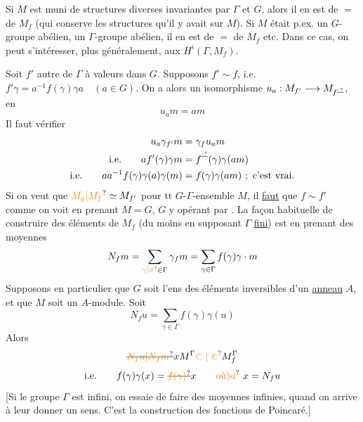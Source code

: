 Si $M$ est muni  de structures diverses invariantes par $\Gamma$ et $G$, alors il en est de $=$ de $M_f$ (qui conserve les structures qu'il y avait sur $M$). Si $M$ était p.ex. un $G$-groupe abélien,  un $\Gamma$-groupe abélien, il en est de $=$ de $M_f$ etc. Dans ce cas, on peut s'intéresser, plus généralement, aux $H^i(\Gamma,M_f)$.

Soit $f'$  autre  de $\Gamma$ à valeurs dans $G$. Supposons $f'\sim f$, i.e. $f'\gamma=a^{-1}f(\gamma)\gamma a\quad(a\in G)$. On a alors un isomorphisme $u_a:M_{f'}\longrightarrow M_{f\deleted{\unsure{'}}}$, en 
\[
u_a m=a m
\]
Il faut vérifier
\[
\begin{aligned}
u_a\gamma_{f'}m&=\gamma_f u_a m\\
\text{i.e.}\qquad a f'(\gamma)\gamma m&=f^{\deleted{\unsure{'}}}(\gamma)\gamma(am)\\
\text{i.e.}\qquad aa^{-1}f(\gamma)\gamma(a)\gamma(m)&=f(\gamma)\gamma(am)\ ;\ \text{c'est vrai.}
\end{aligned}
\]
Si on veut que $\unsure{M_g|M_f}\simeq M_{f'}$ pour $\mathrm{tt}$ $G$-$\Gamma$-ensemble $M$, il \uline{faut} que $f\sim f'$ comme on voit en prenant $M=G$, $G$ y opérant par .
 La façon habituelle de construire des éléments de $M_f$ (du moins en supposant $\Gamma$ \uline{fini}) est  en prenant des moyennes
\[
N_f m=\sum_{\unsure{\gamma|\sigma}\in\Gamma}\gamma_f m=\sum_{\gamma\in\Gamma}f(\gamma)\gamma\cdot m
\]
Supposons en particulier que $G$ soit l'ens des éléments inversibles d'un \uline{anneau} $A$, et que $M$ soit un $A$-module. Soit  
\[
N_f u=\sum_{\gamma\in\Gamma}f(\gamma)\gamma(u)
\]
Alors
\[
\deleted{\unsure{N_f u|N_f m}}xM^\Gamma\unsure{\subset|\in}M_f^\Gamma
\]
\[
\text{i.e.}\qquad f(\gamma)\gamma(x)=\deleted{\unsure{f(\gamma)}}x\qquad\text{\unsure{où|si} }x=N_f u
\]
[Si le groupe $\Gamma$ est infini, on essaie de faire des moyennes infinies, quand on arrive à leur donner un sens. C'est la  construction des fonctions  de Poincaré.]

